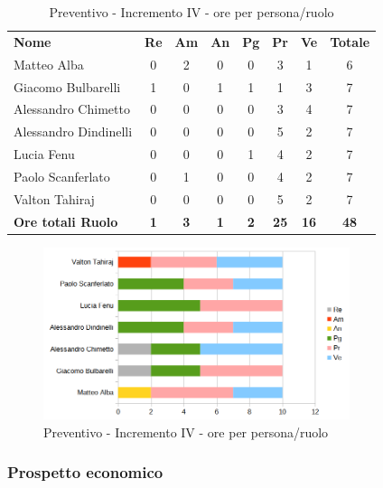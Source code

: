 \begin{table} [h!]
	\begin{center}
		\begin{tabular} { m{3.5cm} c c c c c c c }
			\rowcolor{lightgray}
			\textbf{Nome} & \textbf{Re} & \textbf{Am} & \textbf{An} & \textbf{Pg} & \textbf{Pr} & \textbf{Ve} & \textbf{Totale} \\
			Matteo Alba & 0 & 2 & 0 & 0 & 3 & 1 & 6 \\
			Giacomo Bulbarelli & 1 & 0 & 1 & 1 & 1 & 3 & 7 \\
			Alessandro Chimetto & 0 & 0 & 0 & 0 & 3 & 4 & 7 \\
			Alessandro Dindinelli & 0 & 0 & 0 & 0 & 5 & 2 & 7 \\
			Lucia Fenu & 0 & 0 & 0 & 1 & 4 & 2 & 7 \\
			Paolo Scanferlato & 0 & 1 & 0 & 0 & 4 & 2 & 7 \\
			Valton Tahiraj & 0 & 0 & 0 & 0 & 5 & 2 & 7 \\
			\textbf{Ore totali Ruolo} & \textbf{1} & \textbf{3} & \textbf{1} & \textbf{2} & \textbf{25}& \textbf{16} & \textbf{48}
		\end{tabular}
		\caption{Preventivo - Incremento IV - ore per persona/ruolo}
	\end{center}
\end{table}
\begin{figure} [h!]
	\centering
	\includegraphics[width=0.8\textwidth]{res/img/preventivi/6e7-barre.png}
	\caption{Preventivo - Incremento IV - ore per persona/ruolo} 
\end{figure}

\newpage
\subsubsection{Prospetto economico}

